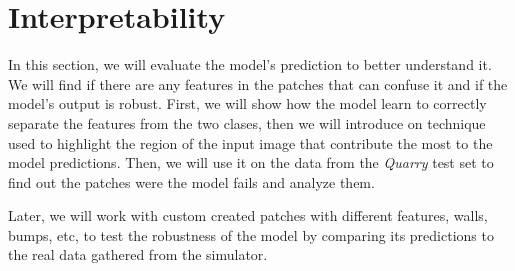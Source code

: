 \documentclass[../document.tex]{subfiles}
\begin{document}
\chapter{Interpretability}
\label{chap: interpretability}
In this section, we will evaluate the model's prediction to better understand it. We will find if there are any features in the patches that can confuse it and if the model's output is robust.
First, we will show how the model learn to correctly separate the features from the two clases, then we will introduce on technique used to highlight the region of the input image that contribute the most to the model predictions. Then, we will use it on the data from the \emph{Quarry} test set to find out the patches were the model fails and analyze them.

Later, we will work with custom created patches with different features, walls, bumps, etc, to test the robustness of the model by comparing its predictions to the real data gathered from the simulator.
\end{document}
